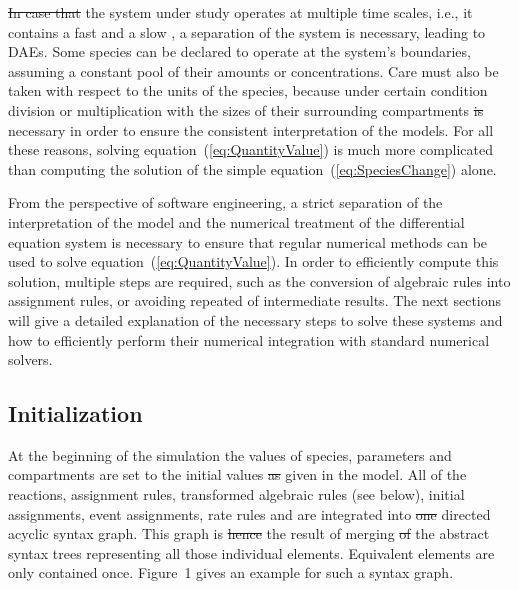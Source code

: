 \documentclass[10pt]{bmc_article}
\newenvironment{bmcformat}{\fussy\setboolean{publ}{true}}{\fussy}
\begin{document}
\begin{bmcformat}
\sout{In case that} the system under study operates at multiple time scales, i.e., it
contains a fast and a slow , a separation of the system is necessary,
leading to \acfp{DAE}.
Some species can be declared to operate at the system's boundaries, assuming a
constant pool of their amounts or concentrations.
Care must also be taken with respect to the units of the species, because under
certain condition division or multiplication with the sizes of their surrounding
compartments \sout{is} necessary in order to ensure the consistent interpretation of
the models. 
For all these reasons, solving equation~(\ref{eq:QuantityValue}) is much more 
complicated than computing the solution of the simple equation~(\ref{eq:SpeciesChange})
alone.

From the perspective of software engineering, a strict separation of the 
interpretation of the model and the numerical treatment of the differential
equation system is necessary to ensure that regular numerical methods can be used
to solve equation~(\ref{eq:QuantityValue}).
In order to efficiently compute this solution, multiple  steps are
required, such as the conversion of algebraic rules into assignment rules, or
avoiding repeated  of intermediate results.
The next sections will give a detailed explanation of the necessary steps to
solve these systems and how to efficiently perform their numerical integration
with standard numerical solvers.


\subsection*{Initialization}

At the beginning of the simulation the values of species, parameters and
compartments are set to the initial values \sout{as} given in the model.
All  of the reactions, assignment rules, transformed algebraic
rules (see below), initial assignments, event assignments, rate rules and
 are integrated into \sout{one} directed
acyclic syntax graph.
This graph is \sout{hence}
the result of merging \sout{of} the abstract syntax trees representing
all those individual elements.
Equivalent elements are only contained once.
Figure~1 gives an example for such a syntax graph.


\end{bmcformat}
\end{document}

